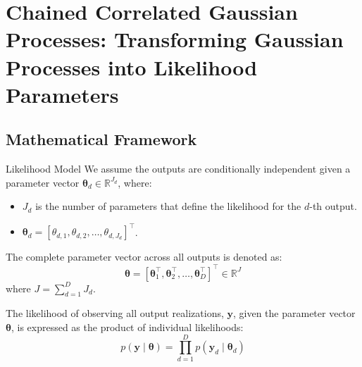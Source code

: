 \section[Chained Correlated Gaussian Processes]{Chained Correlated Gaussian Processes: Transforming Gaussian Processes into Likelihood Parameters}

\subsection{Mathematical Framework}

\begin{frame}{Likelihood Model}
	\justifying
	We assume the outputs are conditionally independent given a parameter vector $\boldsymbol{\theta}_d \in \mathbb{R}^{J_d}$, where:
	
	\begin{itemize}
		\item $J_d$ is the number of parameters that define the likelihood for the $d$-th output.
		\item $\boldsymbol{\theta}_d = [\theta_{d,1}, \theta_{d,2}, \dots, \theta_{d,J_d}]^\top$.
	\end{itemize}
	
	The complete parameter vector across all outputs is denoted as:
	\begin{equation*}
		\boldsymbol{\theta} = [\boldsymbol{\theta}_1^\top, \boldsymbol{\theta}_2^\top, \dots, \boldsymbol{\theta}_D^\top]^\top \in \mathbb{R}^{J}
	\end{equation*}
	where $J = \sum_{d=1}^D J_d$.
	
	The likelihood of observing all output realizations, $\mathbf{y}$, given the parameter vector $\boldsymbol{\theta}$, is expressed as the product of individual likelihoods:
	\begin{equation*}
		p(\mathbf{y} \mid \boldsymbol{\theta}) = \prod_{d=1}^D p\left(\mathbf{y}_d \mid \boldsymbol{\theta}_d\right)
	\end{equation*}
\end{frame}


